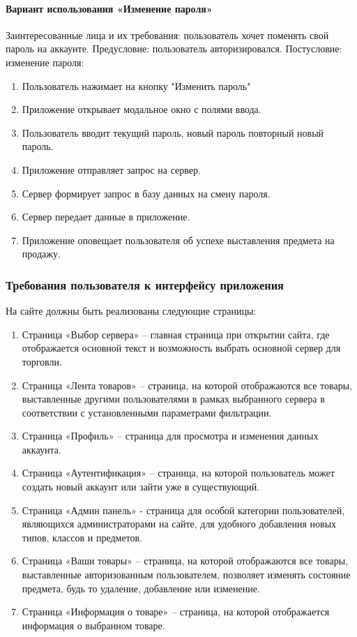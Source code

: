 \paragraph{Вариант использования «Изменение пароля»}

Заинтересованные лица и их требования: пользователь хочет поменять свой пароль на аккаунте. Предусловие: пользователь авторизировался. Постусловие: изменение пароля:

\begin{enumerate}
	\item Пользователь нажимает на кнопку "Изменить пароль"
	\item Приложение открывает модальное окно с полями ввода.
	\item Пользователь вводит текущий пароль, новый пароль повторный новый пароль.
	\item Приложение отправляет запрос на сервер.
	\item Сервер формирует запрос в базу данных на смену пароля.
	\item Сервер передает данные в приложение.
	\item Приложение оповещает пользователя об успехе выставления предмета на продажу.
\end{enumerate}

\subsubsection{Требования пользователя к интерфейсу приложения}

На сайте должны быть реализованы следующие страницы:

\begin{enumerate}
	\item Страница «Выбор сервера» -- главная страница при открытии сайта, где отображается основной текст и возможность выбрать основной сервер для торговли.
	\item Страница «Лента товаров» -- страница, на которой отображаются все товары, выставленные другими пользователями в рамках выбранного сервера в соответствии с установленными параметрами фильтрации.
	\item Страница «Профиль» -- страница для просмотра и изменения данных аккаунта.
	\item Страница «Аутентификация» -- страница, на которой пользователь может создать новый аккаунт или зайти уже в существующий.
	\item Страница «Админ панель» - страница для особой категории пользователей, являющихся администраторами на сайте, для удобного добавления новых типов, классов и предметов.
	\item Страница «Ваши товары» -- страница, на которой отображаются все товары, выставленные авторизованным пользователем, позволяет изменять состояние предмета, будь то удаление, добавление или изменение.
	\item Страница «Информация о товаре» -- страница, на которой отображается информация о выбранном товаре.
\end{enumerate}

